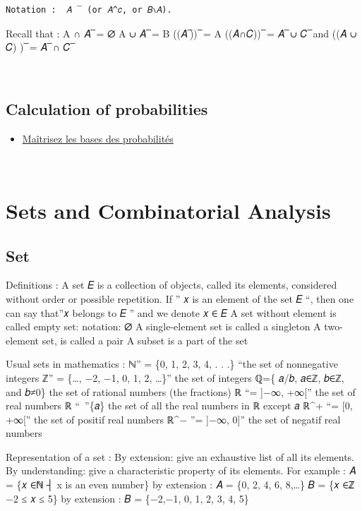 \documentclass[
  letterpaper,
  DIV=11,
  numbers=noendperiod]{scrreprt}
\providecommand{\tightlist}{%
  \setlength{\itemsep}{0pt}\setlength{\parskip}{0pt}}\usepackage{longtable,booktabs,array}
\begin{document}
\begin{verbatim}
Notation :  𝐴 ̅  (or 𝐴^𝑐, or 𝐵∖𝐴). 
\end{verbatim}

Recall that : A ∩ 𝐴~̅ = ∅ A ∪ 𝐴~̅ = B ((𝐴~̅))~̅ = A ((𝐴∩𝐶))~̅ = 𝐴~̅ ∪ 𝐶~̅ and
((𝐴 ∪ 𝐶) )~̅ = 𝐴~̅ ∩ 𝐶~̅

🏁🏁

\section{Calculation of
probabilities}\label{calculation-of-probabilities-1}

\begin{itemize}
\tightlist
\item
  \href{https://openclassrooms.com/fr/courses/4525296-maitrisez-les-bases-des-probabilites}{Maîtrisez
  les bases des probabilités}
\end{itemize}

🏁🏁


\chapter{Sets and Combinatorial
Analysis}\label{sets-and-combinatorial-analysis-1}

\section{Set}\label{set}

Definitions : A set 𝐸 is a collection of objects, called its elements,
considered without order or possible repetition. If '' 𝑥 is an element
of the set 𝐸 ``, then one can say that''𝑥 belongs to 𝐸 '' and we denote
𝑥 ∈ 𝐸 A set without element is called empty set: notation: ∅ A
single-element set is called a singleton A two-element set, is called a
pair A subset is a part of the set

Usual sets in mathematics : ℕ'' = \{0, 1, 2, 3, 4, . . .\} ``the set of
nonnegative integers ℤ'' = \{\ldots, −2, −1, 0, 1, 2, \ldots\}'' the set
of integers ℚ=\{ 𝑎/𝑏, 𝑎∈ℤ, 𝑏∈ℤ, and 𝑏≠0\} the set of rational numbers
(the fractions) ℝ ``= {]}−∞, +∞{[}'' the set of real numbers ℝ
``~''\{𝑎\} the set of all the real numbers in ℝ except 𝑎 ℝ\^{}+ ``=
{[}0, +∞{[}'' the set of positif real numbers ℝ\^{}− ''= {]}−∞, 0{]}''
the set of negatif real numbers

Representation of a set : By extension: give an exhaustive list of all
its elements. By understanding: give a characteristic property of its
elements. For example : 𝐴 = \{𝑥 ∈ℕ ┤\textbar{} x is an even number\} by
extension : 𝐴 = \{0, 2, 4, 6, 8,\ldots\} 𝐵 = \{𝑥 ∈ℤ \textbar{} −2 ≤ 𝑥 ≤
5\} by extension : 𝐵 = \{−2,−1, 0, 1, 2, 3, 4, 5\}
\end{document}
